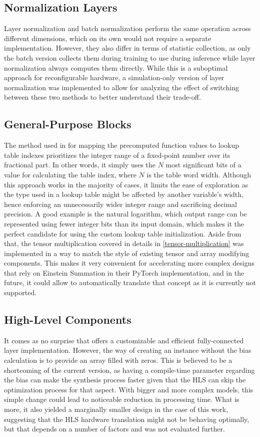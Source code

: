 \subsection{Normalization Layers}
Layer normalization and batch normalization perform the same operation across different dimensions, which on its own would not require a separate implementation. However, they also differ in terms of statistic collection, as only the batch version collects them during training to use during inference while layer normalization always computes them directly. While this is a suboptimal approach for reconfigurable hardware, a simulation-only version of layer normalization was implemented to allow for analyzing the effect of switching between these two methods to better understand their trade-off.

\subsection{General-Purpose Blocks}\label{hls4ml-general-purpose}
The method used in \hlsml for mapping the precomputed function values to lookup table indexes prioritizes the integer range of a fixed-point number over its fractional part. In other words, it simply uses the \(N\) most significant bits of a value for calculating the table index, where \(N\) is the table word width. Although this approach works in the majority of cases, it limits the ease of exploration as the type used in a lookup table might be affected by another variable's width, hence enforcing an unnecessarily wider integer range and sacrificing decimal precision. A good example is the natural logarithm, which output range can be represented using fewer integer bits than its input domain, which makes it the perfect candidate for using the custom lookup table initialization. Aside from that, the tensor multiplication covered in details in \cref{tensor-multiplication} was implemented in a way to match the style of existing tensor and array modifying components. This makes it very convenient for accelerating more complex designs that rely on Einstein Summation in their PyTorch implementation, and in the future, it could allow \hlsml to automatically translate that concept as it is currently not supported.

\subsection{High-Level Components}
It comes as no surprise that \hlsml offers a customizable and efficient fully-connected layer implementation. However, the way of creating an instance without the bias calculation is to provide an array filled with zeros. This is believed to be a shortcoming of the current version, as having a compile-time parameter regarding the bias can make the synthesis process faster given that the HLS can skip the optimization process for that aspect. With bigger and more complex models, this simple change could lead to noticeable reduction in processing time. What is more, it also yielded a marginally smaller design in the case of this work, suggesting that the HLS hardware translation might not be behaving optimally, but that depends on a number of factors and was not evaluated further.

